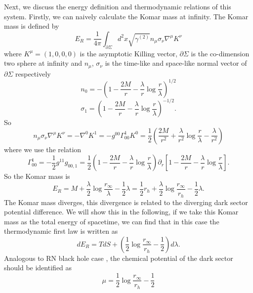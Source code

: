 \documentclass[a4paper,11pt]{article}
\begin{document}
Next, we discuss the energy definition and thermodynamic relations of this system. Firstly, we can naively calculate the Komar mass at infinity. The Komar mass is defined by 
\begin{equation}
      E_{R}=\frac{1}{4\pi} \int_{\partial \Sigma} d^{2}x \sqrt{\gamma^{(2)} }n_{\mu}\sigma_{\nu} \nabla^{\mu} K^{\nu}
\end{equation}
where $K^{\mu}=(1,0,0,0)$ is the asymptotic Killing vector, $\partial \Sigma$ is the co-dimension two sphere at infinity and $n_{\mu}$, $\sigma_{\nu}$ is the time-like and space-like normal vector of $\partial \Sigma$ respectively
\begin{equation}
    n_{0}=-(1-\frac{2M}{r}-\frac{\lambda}{r} \log \frac{r}{\lambda})^{1/2}
\end{equation}
\begin{equation}
    \sigma_{1}=(1-\frac{2M}{r}-\frac{\lambda}{r} \log \frac{r}{\lambda})^{-1/2}.
\end{equation}
So 
\begin{equation}
n_{\mu} \sigma_{\nu} \nabla^{\mu} K^{\nu}=-\nabla^{0} K^{1}=-g^{00} \Gamma^{1}_{00} K^{0}=\frac{1}{2} (\frac{2M}{r^{2}}+\frac{\lambda}{r^{2}} \log \frac{r}{\lambda}-\frac{\lambda}{r^{2}})
\end{equation}
where we use the relation
\begin{equation}
    \Gamma^{1}_{00}=-\frac{1}{2}g^{11}g_{00,1}=\frac{1}{2}(1-\frac{2M}{r}-\frac{\lambda}{r}\log \frac{r}{\lambda})\partial_{r}[1-\frac{2M}{r}-\frac{\lambda}{r} \log \frac{r}{\lambda}].
\end{equation}
So the Komar mass is 
\begin{equation}
    E_{R}=M+\frac{\lambda}{2} \log \frac{r_{\infty}}{\lambda}-\frac{1}{2}\lambda=\frac{1}{2}r_{h}+\frac{\lambda}{2} \log \frac{r_{\infty}}{r_{h}}-\frac{1}{2}\lambda.
\end{equation}
The Komar mass diverges, this divergence is related to the diverging dark sector potential difference. We will show this in the following, if we take this Komar mass as the total energy of spacetime, we can find that in this case the thermodynamic first law is written as 
\begin{equation}
    dE_{R}=TdS+(\frac{1}{2}\log \frac{r_{\infty}}{r_{h}}-\frac{1}{2})d\lambda.
\end{equation}
Analogous to RN black hole case \cite{Kubiznak:2012wp,Kubiznak:2016qmn}, the chemical potential of the dark sector should be identified as 
\begin{equation}
    \mu=\frac{1}{2}\log \frac{r_{\infty}}{r_{h}}-\frac{1}{2}
\end{equation}
\end{document}
